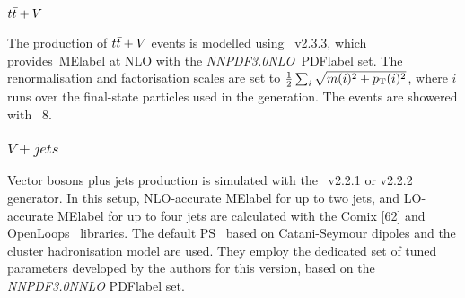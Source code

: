 \subsubsection{$t\bar{t}+V$}
The production of $t\bar{t}+V$ events is modelled using \MGMCatNLO~v2.3.3, which provides~\acrshort{MElabel} at
NLO with the \textit{NNPDF3.0NLO}~\acrshort{PDFlabel} set. The renormalisation and factorisation scales are set to $\frac{1}{2}\sum_i\sqrt{m(i)^2+p_{\text{T}}(i)^2}$, where $i$ runs over the final-state particles used in the generation. The events are showered with \PYTHIA~8.

\subsubsection{$V+jets$}
Vector bosons plus jets production is simulated with the \SHERPA~v2.2.1 or v2.2.2 generator. In this setup, NLO-accurate \acrshort{MElabel} for up to two jets, and LO-accurate \acrshort{MElabel} for up to four jets are calculated with the Comix [62] and OpenLoops~\cite{Gleisberg_2008,PhysRevLett.108.111601,DENNER2017220} libraries. The default \SHERPA PS~\cite{Schumann_2008} based on Catani-Seymour dipoles and the cluster hadronisation model are used. They employ the dedicated set of tuned parameters developed by the \SHERPA authors for this version, based on the \textit{NNPDF3.0NNLO} \acrshort{PDFlabel} set. %


